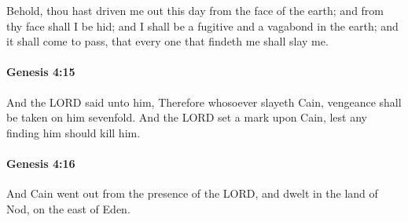 			Behold, thou hast driven me out this day from the face of the earth; and from thy face shall I be hid; and I shall be a fugitive and a vagabond in the earth; and it shall come to pass, that every one that findeth me shall slay me.


		\paragraph{Genesis 4:15} %
			\label{GENESIS-4-15}

			And the LORD said unto him, Therefore whosoever slayeth Cain, vengeance shall be taken on him sevenfold.  And the LORD set a mark upon Cain, lest any finding him should kill him.


		\paragraph{Genesis 4:16} %
			\label{GENESIS-4-16}

			And Cain went out from the presence of the LORD, and dwelt in the land of Nod, on the east of Eden.


